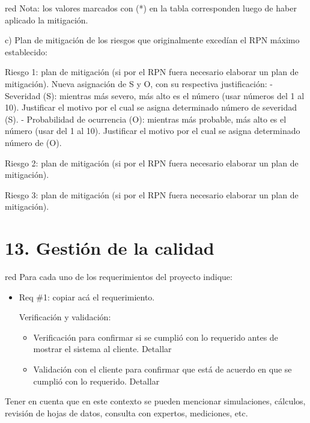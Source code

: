 \documentclass[11pt]{charter}
\begin{document}
\begin{consigna}{red}
Nota: los valores marcados con (*) en la tabla corresponden luego de haber aplicado la mitigación.

c) Plan de mitigación de los riesgos que originalmente excedían el RPN máximo establecido:
 
Riesgo 1: plan de mitigación (si por el RPN fuera necesario elaborar un plan de mitigación).
  Nueva asignación de S y O, con su respectiva justificación:
  - Severidad (S): mientras más severo, más alto es el número (usar números del 1 al 10).
          Justificar el motivo por el cual se asigna determinado número de severidad (S).
  - Probabilidad de ocurrencia (O): mientras más probable, más alto es el número (usar del 1 al 10).
          Justificar el motivo por el cual se asigna determinado número de (O).

Riesgo 2: plan de mitigación (si por el RPN fuera necesario elaborar un plan de mitigación).
 
Riesgo 3: plan de mitigación (si por el RPN fuera necesario elaborar un plan de mitigación).

\end{consigna}


\section{13. Gestión de la calidad}
\label{sec:calidad}

\begin{consigna}{red}
Para cada uno de los requerimientos del proyecto indique:
\begin{itemize} 
\item Req \#1: copiar acá el requerimiento.

Verificación y validación:

\begin{itemize}
\item Verificación para confirmar si se cumplió con lo requerido antes de mostrar el sistema al cliente. Detallar 
\item Validación con el cliente para confirmar que está de acuerdo en que se cumplió con lo requerido. Detallar  
\end{itemize}

\end{itemize}

Tener en cuenta que en este contexto se pueden mencionar simulaciones, cálculos, revisión de hojas de datos, consulta con expertos, mediciones, etc.

\end{consigna}
\end{document}
